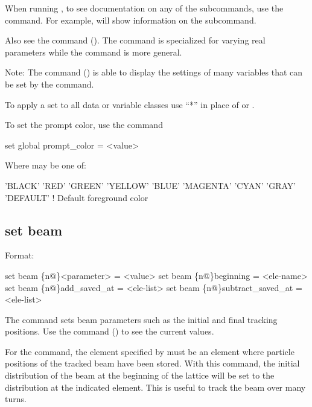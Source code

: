 {{\vskip 10pt 

When running \tao, to see documentation on any of the subcommands, use the  command. For example,  will show information on the  subcommand.

Also see the  command (). The  command is specialized for
varying real parameters while the  command is more general.

Note: The  command () is able to display the settings of many variables that
can be set by the  command.

To apply a set to all data or variable classes use ``*'' in place of  or .

To set the prompt color, use the command
\begin{example}
  set global prompt_color = <value>
\end{example}
Where  may be one of:
\begin{example}
  'BLACK'
  'RED'
  'GREEN'
  'YELLOW'
  'BLUE'
  'MAGENTA'
  'CYAN'
  'GRAY'
  'DEFAULT'       ! Default foreground color
\end{example}



\subsection{set beam}
\label{s:set.beam}

Format:
\begin{example}
  set beam \{n@\}<parameter> = <value>
  set beam \{n@\}beginning = <ele-name>
  set beam \{n@\}add_saved_at = <ele-list>
  set beam \{n@\}subtract_saved_at = <ele-list>
\end{example}

The  command sets beam parameters such as the initial and final tracking positions.
Use the  command () to see the current values.

For the  command, the element specified by  must be
an element where particle positions of the tracked beam have been stored. With this command, the
initial distribution of the beam at the beginning of the lattice will be set to the distribution at
the indicated element. This is useful to track the beam over many turns.

}}
